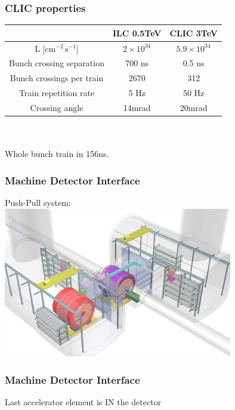 \documentclass{beamer}
\begin{document}
\begin{frame}
\frametitle{CLIC properties}
\begin{center}
\begin{tabular}{ccc}
 & ILC 0.5TeV & CLIC 3TeV\\
 \midrule
L [$\textrm{cm}^{-2}\,\textrm{s}^{-1}$] & $2\times 10^{34}$&$5.9\times 10^{34}$ \\
\midrule
Bunch crossing separation  & 700 ns & \alert{0.5 ns}\\
\midrule
Bunch crossings per train & 2670 & \alert{312}\\
\midrule
Train repetition rate  & 5 Hz & 50 Hz\\
\midrule
Crossing angle & 14mrad & 20mrad\\
\bottomrule
\end{tabular}\\
~\\
\alert{Whole bunch train in 156ns.}
\end{center}
\end{frame}
\begin{frame}
\frametitle{Machine Detector Interface}
Push-Pull system:\\
\includegraphics[width=10cm]{PushPull.png}
\end{frame}
\begin{frame}
\frametitle{Machine Detector Interface}
\begin{center}
\alert{Last accelerator element is IN the detector}
\end{center}
\end{frame}
\end{document}
